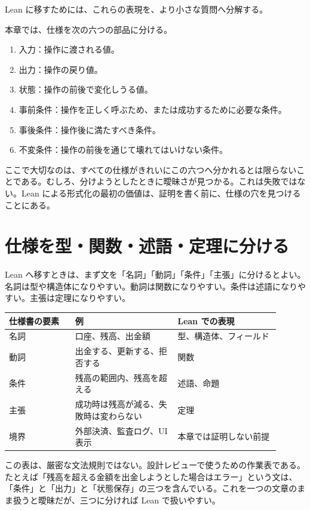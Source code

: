 Lean に移すためには、これらの表現を、より小さな質問へ分解する。

\begin{definitionbox}
本章では、仕様を次の六つの部品に分ける。
\begin{enumerate}
\item 入力：操作に渡される値。
\item 出力：操作の戻り値。
\item 状態：操作の前後で変化しうる値。
\item 事前条件：操作を正しく呼ぶため、または成功するために必要な条件。
\item 事後条件：操作後に満たすべき条件。
\item 不変条件：操作の前後を通じて壊れてはいけない条件。
\end{enumerate}
\end{definitionbox}

ここで大切なのは、すべての仕様がきれいにこの六つへ分かれるとは限らないことである。むしろ、分けようとしたときに曖昧さが見つかる。これは失敗ではない。Lean による形式化の最初の価値は、証明を書く前に、仕様の穴を見つけることにある。

\section{仕様を型・関数・述語・定理に分ける}

Lean へ移すときは、まず文を「名詞」「動詞」「条件」「主張」に分けるとよい。名詞は型や構造体になりやすい。動詞は関数になりやすい。条件は述語になりやすい。主張は定理になりやすい。

\begin{center}
\begin{tabular}{p{0.22\linewidth}p{0.34\linewidth}p{0.34\linewidth}}
\toprule
仕様書の要素 & 例 & Lean での表現 \\
\midrule
名詞 & 口座、残高、出金額 & 型、構造体、フィールド \\
動詞 & 出金する、更新する、拒否する & 関数 \\
条件 & 残高の範囲内、残高を超える & 述語、命題 \\
主張 & 成功時は残高が減る、失敗時は変わらない & 定理 \\
境界 & 外部決済、監査ログ、UI表示 & 本章では証明しない前提 \\
\bottomrule
\end{tabular}
\end{center}

この表は、厳密な文法規則ではない。設計レビューで使うための作業表である。たとえば「残高を超える金額を出金しようとした場合はエラー」という文は、「条件」と「出力」と「状態保存」の三つを含んでいる。これを一つの文章のまま扱うと曖昧だが、三つに分ければ Lean で扱いやすい。

